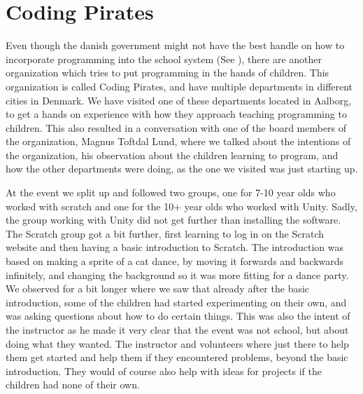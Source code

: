 \section{Coding Pirates}
\label{sec:coding_pirates}
Even though the danish government might not have the best handle on how to incorporate programming into the school system (See ), there are another organization which tries to put programming in the hands of children. This organization is called Coding Pirates, and have multiple departments in different cities in Denmark. We have visited one of these departments located in Aalborg, to get a hands on experience with how they approach teaching programming to children. This also resulted in a conversation with one of the board members of the organization, Magnus Toftdal Lund, where we talked about the intentions of the organization, his observation about the children learning to program, and how the other departments were doing, as the one we visited was just starting up.

At the event we split up and followed two groups, one for 7-10 year olds who worked with scratch and one for the 10+ year olds who worked with Unity. Sadly, the group working with Unity did not get further than installing the software. The Scratch group got a bit further, first learning to log in on the Scratch website and then having a basic introduction to Scratch. The introduction was based on making a sprite of a cat dance, by moving it forwards and backwards infinitely, and changing the background so it was more fitting for a dance party. We observed for a bit longer where we saw that already after the basic introduction, some of the children had started experimenting on their own, and was asking questions about how to do certain things. This was also the intent of the instructor as he made it very clear that the event was not school, but about doing what they wanted. The instructor and volunteers where just there to help them get started and help them if they encountered problems, beyond the basic introduction. They would of course also help with ideas for projects if the children had none of their own.

